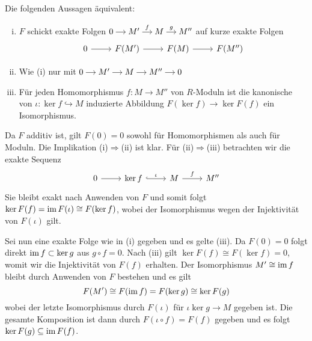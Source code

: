 Die folgenden Aussagen äquivalent:
\begin{enumerate}[(i)]
	\item $F$ schickt exakte Folgen $ \begin{tikzcd}[cramped,sep=small]
		0 \rar & M' \rar["f"] & M \rar["g"] & M''
	\end{tikzcd}$ auf kurze exakte Folgen
	\[
		\begin{tikzcd}
			0 \rar & F(M') \rar & F(M) \rar & F(M'')
		\end{tikzcd}
	\]
	\item Wie (i) nur mit 
	\(
		\begin{tikzcd}[cramped,sep=small]
			0 \rar & M' \rar & M \rar & M'' \rar & 0
		\end{tikzcd}
	\)
	\item Für jeden Homomorphismus $f \colon M \to M''$ von $R$-Moduln ist die kanonische von $\iota \colon \ker f \hookrightarrow M$ induzierte Abbildung $F(\ker f) \to \ker F(f)$ ein Isomorphismus.
\end{enumerate}
\begin{beweis}
	Da $F$ additiv ist, gilt $F(0)=0$ sowohl für Homomorphismen als auch für Moduln. 
	Die Implikation (i)$\Rightarrow$(ii) ist klar.
	Für (ii)$\Rightarrow$(iii) betrachten wir die exakte Sequenz
	\[
		\begin{tikzcd}
			0 \rar & \ker f \rar[hook,"\iota"] & M \rar["f"] & M''
		\end{tikzcd}
	\]
	Sie bleibt exakt nach Anwenden von $F$ und somit folgt $\ker F(f) = \operatorname{im} F(\iota) \cong F(\ker f)$, wobei der Isomorphismus wegen der Injektivität von $F(\iota)$ gilt.
	
	Sei nun eine exakte Folge wie in (i) gegeben und es gelte (iii).
	Da $F(0)=0$ folgt direkt $\operatorname{im} f \subset \ker g$ aus $g \circ f =0$.
	Nach (iii) gilt $\ker F(f) \cong F(\ker f) = 0$, womit wir die Injektivität von $F(f)$ erhalten.
	Der Isomorphismus $M' \cong \operatorname{im} f$ bleibt durch Anwenden von $F$ bestehen und es gilt
	\[
		F(M') \cong F(\operatorname{im} f) = F(\ker g) \cong \ker F(g)
	\]
	wobei der letzte Isomorphismus durch $F(\iota)$ für $\iota \ker g \to M$ gegeben ist.
	Die gesamte Komposition ist dann durch $F(\iota \circ f) = F(f)$ gegeben und es folgt $\ker F(g) \subseteq \operatorname{im} F(f)$.
\end{beweis}

